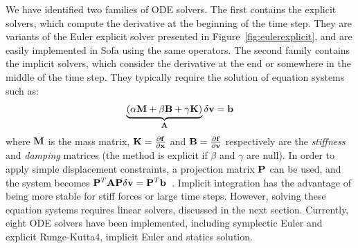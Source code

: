 

We have identified two families of ODE solvers.
The first contains the explicit solvers, which compute the derivative at the beginning of the time step. They are variants of the Euler explicit solver presented in Figure~\ref{fig:eulerexplicit}, and are easily implemented in Sofa using the same operators.
The second family contains the implicit solvers, which consider the derivative at the end or somewhere in the middle of the time step. They typically require the solution of equation systems such as:
\begin{equation}
\label{eq:linear-system}
\underbrace{\left(\alpha \M  + \beta \B  + \gamma \K \right)}_{\mathbf{A}}   \Vdv =  \vec b
\end{equation}
where $\M$ is the mass matrix, $\K = \frac{\partial \Vf}{\partial \Vx}$ and $\B = \frac{\partial \Vf}{\partial \Vv}$ respectively are the \textit{stiffness} and \textit{damping} matrices (the method is explicit if $\beta$ and $\gamma$ are null). In order to apply simple displacement constraints,  a projection matrix $\P$ can be used, and the system becomes $\P^T \mathbf{A} \P \Vdv =\P^T \vec b $~\cite{baraff98large}.
Implicit integration has the advantage of being more stable for stiff forces or large time steps. However, solving these equation systems requires linear solvers, discussed in the next section.
Currently, eight ODE solvers have been implemented, including symplectic Euler and explicit Runge-Kutta4, implicit Euler and statics solution.



